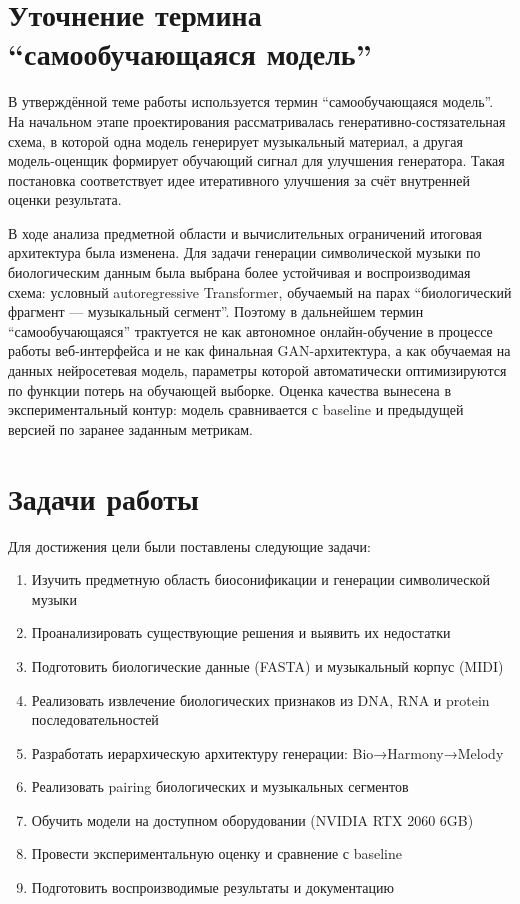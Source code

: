 \section*{Уточнение термина ``самообучающаяся модель''}

В утверждённой теме работы используется термин ``самообучающаяся модель''. На начальном этапе проектирования рассматривалась генеративно-состязательная схема, в которой одна модель генерирует музыкальный материал, а другая модель-оценщик формирует обучающий сигнал для улучшения генератора. Такая постановка соответствует идее итеративного улучшения за счёт внутренней оценки результата.

В ходе анализа предметной области и вычислительных ограничений итоговая архитектура была изменена. Для задачи генерации символической музыки по биологическим данным была выбрана более устойчивая и воспроизводимая схема: условный autoregressive Transformer, обучаемый на парах ``биологический фрагмент — музыкальный сегмент''. Поэтому в дальнейшем термин ``самообучающаяся'' трактуется не как автономное онлайн-обучение в процессе работы веб-интерфейса и не как финальная GAN-архитектура, а как обучаемая на данных нейросетевая модель, параметры которой автоматически оптимизируются по функции потерь на обучающей выборке. Оценка качества вынесена в экспериментальный контур: модель сравнивается с baseline и предыдущей версией по заранее заданным метрикам.

\section*{Задачи работы}

Для достижения цели были поставлены следующие задачи:
\begin{enumerate}
\item Изучить предметную область биосонификации и генерации символической музыки
\item Проанализировать существующие решения и выявить их недостатки
\item Подготовить биологические данные (FASTA) и музыкальный корпус (MIDI)
\item Реализовать извлечение биологических признаков из DNA, RNA и protein последовательностей
\item Разработать иерархическую архитектуру генерации: Bio→Harmony→Melody
\item Реализовать pairing биологических и музыкальных сегментов
\item Обучить модели на доступном оборудовании (NVIDIA RTX 2060 6GB)
\item Провести экспериментальную оценку и сравнение с baseline
\item Подготовить воспроизводимые результаты и документацию
\end{enumerate}

